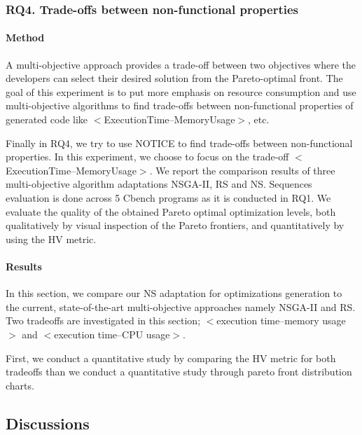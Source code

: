 \subsubsection{RQ4. Trade-offs between non-functional properties}
\paragraph{Method}
A multi-objective approach provides a trade-off between two objectives where the developers can select their desired solution from the Pareto-optimal front. The goal of this experiment is to put more emphasis on resource consumption and use multi-objective algorithms to find trade-offs between non-functional properties of generated code like $<$ExecutionTime--MemoryUsage$>$, etc.



Finally in RQ4, we try to use NOTICE to find trade-offs between non-functional properties. In this experiment, we choose to focus on the trade-off $<$ExecutionTime--MemoryUsage$>$. We report the comparison results of three multi-objective algorithm adaptations NSGA-II, RS and NS. 
Sequences evaluation is done across 5 Cbench programs as it is conducted in RQ1.
We evaluate the quality of the obtained Pareto optimal optimization levels, both qualitatively by visual inspection of the Pareto frontiers, and quantitatively by using the HV metric.
\paragraph{Results}
In this section, we compare our NS adaptation for optimizations generation to the current, state-of-the-art multi-objective approaches namely NSGA-II and RS. Two tradeoffs are investigated in this section; $<$execution time--memory usage$>$ and $<$execution time--CPU usage$>$.

First, we conduct a quantitative study by comparing the HV metric for both tradeoffs than we conduct a quantitative study through pareto front distribution charts.

\noindent{}
\subsection{Discussions}
 
 
 
